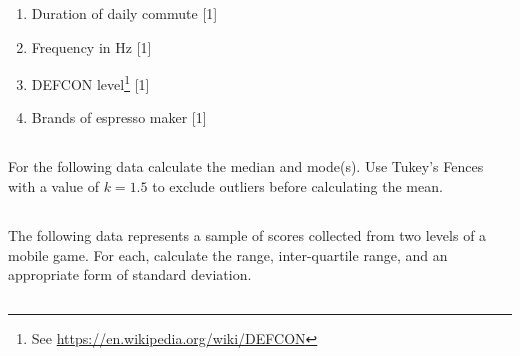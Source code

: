 \documentclass[twocolumn]{article}
\newcounter{pmarks}
\newcounter{marks}
\newcommand\mrk[1]{{\hfill\color{blue}\small[{#1}]}\addtocounter{pmarks}{#1}\addtocounter{marks}{#1}}
\begin{document}
    \begin{enumerate}
        \item Duration of daily commute \mrk{1}
        \item Frequency in Hz \mrk{1}
        \item DEFCON level\footnote{See \url{https://en.wikipedia.org/wiki/DEFCON}} \mrk{1}
        \item Brands of espresso maker \mrk{1}
    \end{enumerate}

\subsection{}

    For the following data calculate the median and mode(s). Use Tukey's Fences with a value of $k=1.5$ to exclude outliers before calculating the mean.

    \begin{multicols}{2}
    \end{multicols}

\subsection{}

    The following data represents a sample of scores collected from two levels of a mobile game. For each, calculate the range, inter-quartile range, and an appropriate form of standard deviation.  

    \begin{multicols}{2}
    \end{multicols}

    \subsection{}
\end{document}
